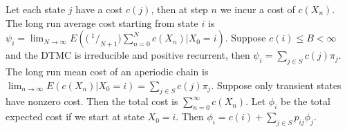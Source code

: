  Let each state $j$ have a cost $c(j)$, then at step $n$ we incur a cost of $c(X_n)$.
 The long run average cost starting from state $i$ is 
$\psi_i = \lim_{N \to \infty} E\left(\bigr(\ ^1/_{N+1}\bigl) \sum^N_{n = 0} c(X_n) \big| X_0 = i\right).$
 Suppose $c(i) \le B < \infty$ and the DTMC is irreducible and positive recurrent, then $\psi_i = \sum_{j \in S} c(j) \pi_j$.
 The long run mean cost of an aperiodic chain is 
$\lim_{n \to \infty} E(c(X_n)|X_0 = i) = \sum_{j \in S} c(j)\pi_j$. 
 Suppose only transient states have nonzero cost. Then the total cost is $\sum^{\infty}_{n = 0} c(X_n)$. Let $\phi_i$ be the total expected cost if we start at state $X_0 = i$. Then 
$\phi_i = c(i) + \sum_{j \in S} p_{ij}\phi_j$.